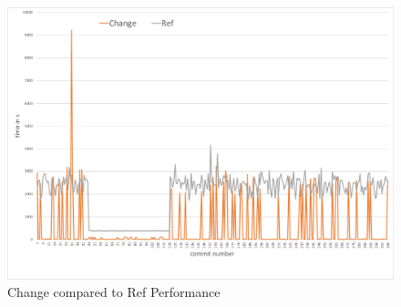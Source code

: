 \documentclass[a4paper]{article}
\begin{document}
\begin{figure}[h] 
  \centering
  \begin{minipage}[b]{1\textwidth} 
    \caption[Change Performance]{Change compared to Ref Performance}\label{fig:change}
    \centering
    \includegraphics[height=1\textwidth, angle=90]{img/change-vs-ref.pdf}
  \end{minipage}
\end{figure}
\end{document}
